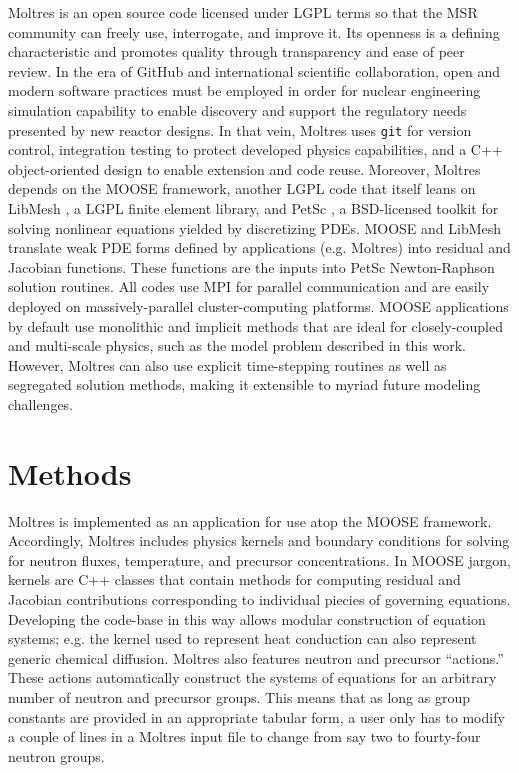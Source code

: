 \documentclass{article}
\let\Oldsection\section
\renewcommand{\section}{\FloatBarrier\Oldsection}
\begin{document}
Moltres is an open source code licensed under \gls{LGPL} terms so that the 
\gls{MSR} community can freely use, interrogate, and improve it.  Its openness 
is a defining characteristic and promotes
quality through transparency and ease of peer review. In the era of
GitHub\cite{noauthor_build_nodate} and international scientific collaboration,
open and modern software practices must be employed in order for nuclear
engineering simulation capability to enable discovery and support the regulatory
needs presented by new reactor designs. In that vein, Moltres uses
\texttt{git} for version control, integration testing to protect
developed physics capabilities, and a C++ object-oriented design to
enable extension and code reuse. Moreover, Moltres depends on the \gls{MOOSE} 
framework, \cite{gaston_physics-based_2015} another \gls{LGPL} code that itself 
leans on LibMesh \cite{kirk_libmesh:_2006}, a
\gls{LGPL} finite element library, and PetSc \cite{satish_balay_petsc_2015}, a
\gls{BSD}-licensed toolkit for solving nonlinear equations yielded by 
discretizing PDEs. \gls{MOOSE} and LibMesh translate weak PDE forms defined by
applications (e.g. Moltres) into residual and Jacobian
functions. These functions are the inputs into PetSc Newton-Raphson solution routines. All
codes use MPI for parallel communication and are easily deployed on
massively-parallel cluster-computing platforms. \gls{MOOSE} applications by
default use monolithic and implicit methods that are ideal for closely-coupled
and multi-scale physics, such as the model problem described
in this work. However, Moltres can also use explicit
time-stepping routines as well as segregated solution methods, making it 
extensible to myriad future modeling challenges.

\section{Methods}

Moltres \cite{lindsay_arfc/moltres_nodate} is implemented as an application for
use atop the \gls{MOOSE} \cite{gaston_physics-based_2015} framework.
Accordingly, Moltres includes physics kernels and boundary conditions for
solving for neutron fluxes, temperature, and precursor concentrations. In \gls{MOOSE}
jargon, kernels are C++ classes that contain methods for computing residual and
Jacobian contributions corresponding to individual piecies of governing
equations. Developing the code-base in this way allows modular construction
of equation systems; e.g. the kernel used to represent heat
conduction can also represent generic chemical diffusion. Moltres
also features neutron and precursor ``actions.'' These actions automatically 
construct the systems of equations for an arbitrary number of neutron and
precursor groups. This means that as long as group constants are provided in an appropriate
tabular form, a user only has to modify a couple of lines in a Moltres input
file to change from say two to fourty-four neutron groups.
\end{document}
